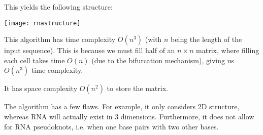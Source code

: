 This yields the following structure:

\texttt{[image: rnastructure]}

This algorithm has time complexity $O(n^3)$ (with $n$ being the length of the input sequence). This is because we must fill half of an $n \times n$ matrix, where filling each cell takes time $O(n)$ (due to the bifurcation mechanism), giving us $O(n^3)$ time complexity.

It has space complexity $O(n^2)$ to store the matrix.

The algorithm has a few flaws. For example, it only considers 2D structure, whereas RNA will actually exist in 3 dimensions. Furthermore, it does not allow for RNA pseudoknots, i.e. when one base pairs with two other bases.





    

